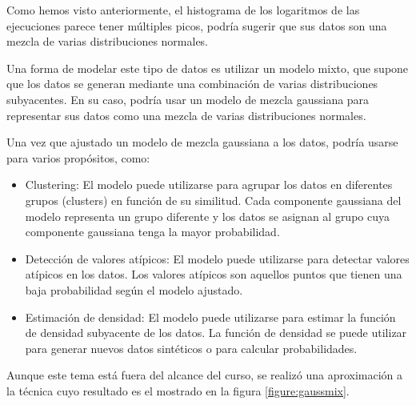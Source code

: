 Como hemos visto anteriormente, el histograma de los logaritmos de las ejecuciones parece tener múltiples picos, podría sugerir que sus datos son una mezcla de varias distribuciones normales.

Una forma de modelar este tipo de datos es utilizar un modelo mixto, que supone que los datos se generan mediante una combinación de varias distribuciones subyacentes. En su caso, podría usar un modelo de mezcla gaussiana para representar sus datos como una mezcla de varias distribuciones normales.

Una vez que ajustado un modelo de mezcla gaussiana a los datos, podría usarse para varios propósitos, como:

\begin{itemize}
    \item Clustering: El modelo puede utilizarse para agrupar los datos en diferentes grupos (clusters) en función de su similitud. Cada componente gaussiana del modelo representa un grupo diferente y los datos se asignan al grupo cuya componente gaussiana tenga la mayor probabilidad.

    \item Detección de valores atípicos: El modelo puede utilizarse para detectar valores atípicos en los datos. Los valores atípicos son aquellos puntos que tienen una baja probabilidad según el modelo ajustado.

    \item Estimación de densidad: El modelo puede utilizarse para estimar la función de densidad subyacente de los datos. La función de densidad se puede utilizar para generar nuevos datos sintéticos o para calcular probabilidades.
\end{itemize}

Aunque este tema está fuera del alcance del curso, se realizó una aproximación a la técnica cuyo resultado es el mostrado en la figura \ref{figure:gaussmix}.

